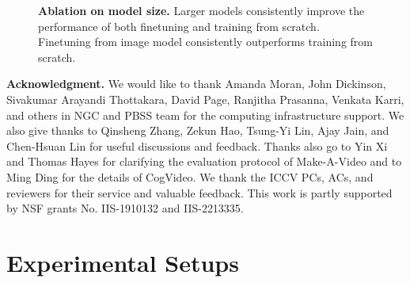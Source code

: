 \documentclass[10pt,twocolumn,letterpaper]{article}
\newcommand{\plothh}{}\newcommand{\plothc}{}\newcommand{\plotvv}{}
\newcommand{\tickYtopD}[1]{\raisebox{-1.5ex}[0ex][0ex]{#1}}
\newcommand{\tickFVD}{\tickYtopD{FVD}}
\newcommand{\topic}[1]
{
\vspace{2mm}\noindent\textbf{#1}
}
\newcommand{\new}[1]{#1}
\begin{document}
\newcommand{\ModelEffKaalIS}{
(68, 28.25)
(112, 31.16)
(253, 38.28)
} 
\vspace{-2mm}
\renewcommand{\plothh}{90mm}
\renewcommand{\plothc}{85mm}
\renewcommand{\plotvv}{50mm}
\begin{figure}[t!]
    \centering
    \small
\scriptsize
{}
    \caption{\textbf{Ablation on model size.} Larger models consistently improve the performance of both finetuning and training from scratch. Finetuning from image model consistently outperforms training from scratch.}
    \label{fig:sweep_modelsize}
\end{figure} 
\topic{Acknowledgment.} We would like to thank Amanda Moran, John Dickinson, Sivakumar Arayandi Thottakara, David Page, Ranjitha Prasanna, Venkata Karri, and others in NGC and PBSS team for the computing infrastructure support. We also give thanks to Qinsheng Zhang, Zekun Hao, Tsung-Yi Lin, Ajay Jain, and Chen-Hsuan Lin for useful discussions and feedback. Thanks also go to Yin Xi and Thomas Hayes for clarifying the evaluation protocol of Make-A-Video and to Ming Ding for the details of CogVideo.  
\new{We thank the ICCV PCs, ACs, and reviewers for their service and valuable feedback.}
This work is partly supported by NSF grants No. IIS-1910132 and IIS-2213335.  
\clearpage
\appendix

\renewcommand{\thetable}{\Alph{table}}
\renewcommand{\thefigure}{\Alph{figure}}
\renewcommand{\theequation}{\Alph{equation}}

\section{Experimental Setups}
\label{sec:addtional_details}
\end{document}
